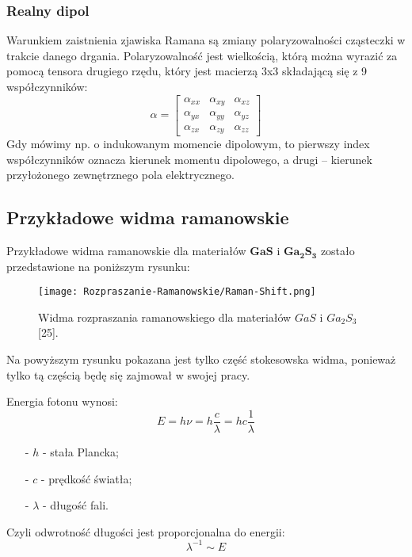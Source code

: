 \subsubsection{Realny dipol}
Warunkiem zaistnienia zjawiska Ramana są zmiany polaryzowalności cząsteczki w trakcie danego drgania. Polaryzowalność jest wielkością, którą można wyrazić za pomocą tensora drugiego rzędu, który jest macierzą 3x3 składającą się z 9 współczynników:
\begin{equation}
	\alpha = 
	\begin{bmatrix}
	\alpha_{xx} & \alpha_{xy} & \alpha_{xz} \\
	\alpha_{yx} & \alpha_{yy} & \alpha_{yz} \\
	\alpha_{zx} & \alpha_{zy} & \alpha_{zz}
	\end{bmatrix}
\end{equation}
Gdy mówimy np. o indukowanym momencie dipolowym, to pierwszy index współczynników oznacza kierunek momentu dipolowego, a drugi -- kierunek przyłożonego zewnętrznego pola elektrycznego.

\newpage
\subsection{Przykładowe widma ramanowskie}
Przykładowe widma ramanowskie dla materiałów $\mathbf{GaS}$ i $\mathbf{Ga_{2}S_{3}}$ zostało przedstawione na poniższym rysunku:
\begin{figure}[H]
	\begin{center}
		\texttt{[image: Rozpraszanie-Ramanowskie/Raman-Shift.png]}
		\caption{Widma rozpraszania ramanowskiego dla materiałów $GaS$ i $Ga_{2}S_{3}$ [25].}
	\end{center}
\end{figure}
Na powyższym rysunku pokazana jest tylko część stokesowska widma, ponieważ tylko tą częścią będę się zajmował w swojej pracy.

Energia fotonu wynosi:
\begin{equation}
	E = h \nu = h \frac{c}{\lambda} = hc \frac{1}{\lambda} 
\end{equation}
\begin{itemize}
	\item[-]{$h$ - stała Plancka};
	\item[-]{$c$ - prędkość światła};
	\item[-]{$\lambda$ - długość fali}.
\end{itemize}
Czyli odwrotność długości jest proporcjonalna do energii:
\begin{equation}
	\lambda^{-1} \sim E
\end{equation}

